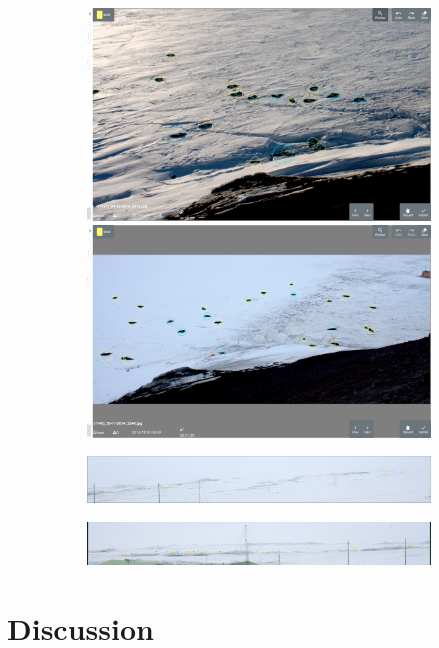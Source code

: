 \begin{figure}[h!]
\centering
\begin{subfigure}[t]{1.0\linewidth}
  \includegraphics[width=0.475\linewidth]{figures/annotation/screenshots/seals_small2.png}
  \hfill
  \includegraphics[width=0.475\linewidth]{figures/annotation/screenshots/seals_small.png}
  \caption{}
\end{subfigure}

\begin{subfigure}[t]{1.0\linewidth}
  \includegraphics[width=1.0\linewidth]{figures/annotation/screenshots/cam_c.png}
\end{subfigure}

\begin{subfigure}[t]{1.0\linewidth}
  \includegraphics[width=1.0\linewidth]{figures/annotation/screenshots/cam_b.png}
  \caption{}
\end{subfigure}



\caption{ }
\label {fig:weddell_images}
\end{figure}



\section{Discussion}


